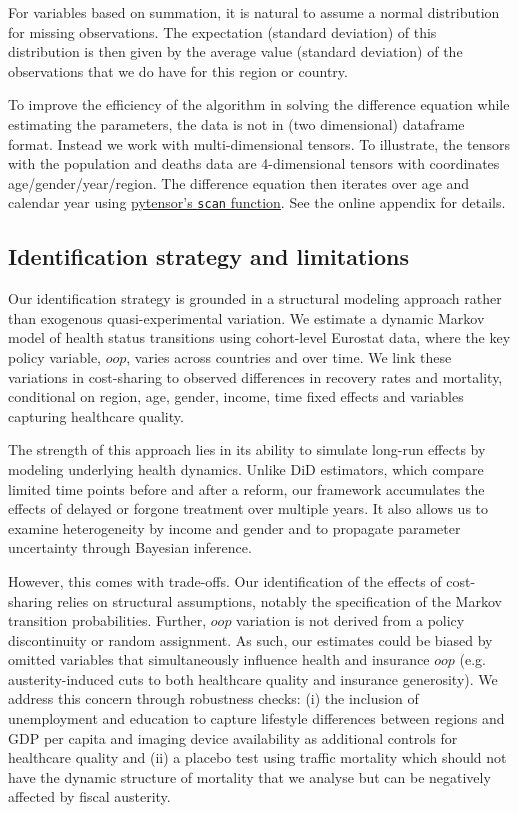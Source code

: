 \documentclass[a4paper,12pt]{article}
\begin{document}
For variables based on summation, it is natural to assume a normal distribution for missing observations. The expectation (standard deviation) of this distribution is then given by the average value (standard deviation) of the observations that we do have for this region or country.

To improve the efficiency of the algorithm in solving the difference equation while estimating the parameters, the data is not in (two dimensional) dataframe format. Instead we work with multi-dimensional tensors. To illustrate, the tensors with the population and deaths data are 4-dimensional tensors with coordinates age/gender/year/region. The difference equation then iterates over age and calendar year using \href{https://pytensor.readthedocs.io/en/latest/library/scan.html}{pytensor's \texttt{scan} function}. See the online appendix for details.
\subsection{Identification strategy and limitations}
\label{sec:org418a639}

Our identification strategy is grounded in a structural modeling approach rather than exogenous quasi-experimental variation. We estimate a dynamic Markov model of health status transitions using cohort-level Eurostat data, where the key policy variable, \(oop\), varies across countries and over time. We link these variations in cost-sharing to observed differences in recovery rates and mortality, conditional on region, age, gender, income, time fixed effects and variables capturing healthcare quality.

The strength of this approach lies in its ability to simulate long-run effects by modeling underlying health dynamics. Unlike DiD estimators, which compare limited time points before and after a reform, our framework accumulates the effects of delayed or forgone treatment over multiple years. It also allows us to examine heterogeneity by income and gender and to propagate parameter uncertainty through Bayesian inference.

However, this comes with trade-offs. Our identification of the effects of cost-sharing relies on structural assumptions, notably the specification of the Markov transition probabilities. Further, \(oop\) variation is not derived from a policy discontinuity or random assignment. As such, our estimates could be biased by omitted variables that simultaneously influence health and insurance \(oop\) (e.g. austerity-induced cuts to both healthcare quality and insurance generosity). We address this concern through robustness checks: (i) the inclusion of unemployment and education to capture lifestyle differences between regions and GDP per capita and imaging device availability as additional controls for healthcare quality and (ii) a placebo test using traffic mortality which should not have the dynamic structure of mortality that we analyse but can be negatively affected by fiscal austerity.
\end{document}
